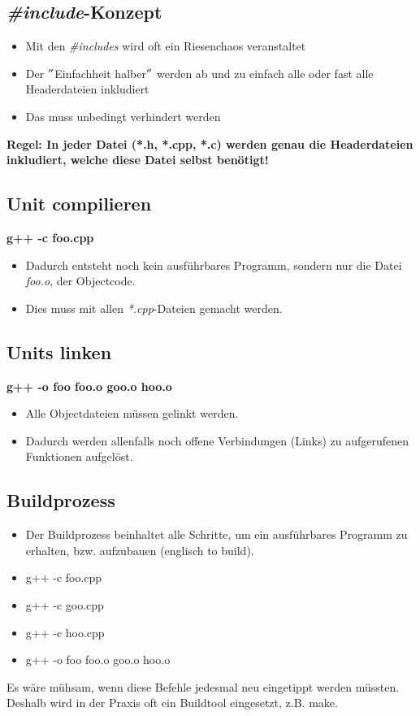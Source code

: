 \subsection{\emph{\#include}-Konzept}
\begin{itemize}
	\item Mit den \emph{\#includes} wird oft ein Riesenchaos veranstaltet
	\item Der $"$Einfachheit halber$"$ werden ab und zu einfach alle oder fast alle Headerdateien inkludiert
	\item Das muss unbedingt verhindert werden
\end{itemize}
\textbf{Regel: In jeder Datei (*.h, *.cpp, *.c) werden genau die Headerdateien inkludiert, welche diese Datei selbst benötigt!}

\begin{multicols}{2}
\subsection{Unit compilieren}
\begin{center}
	\textbf{g++ -c foo.cpp}
\end{center}
\begin{itemize}
	\item Dadurch entsteht noch kein ausführbares Programm, sondern nur die Datei \emph{foo.o}, der Objectcode.
	\item Dies muss mit allen \emph{*.cpp}-Dateien gemacht werden.
\end{itemize}
\columnbreak
\subsection{Units linken}
\begin{center}
	\textbf{g++ -o foo foo.o goo.o hoo.o}
\end{center}
\begin{itemize}
	\item Alle Objectdateien müssen gelinkt werden.
	\item Dadurch werden allenfalls noch offene Verbindungen (Links) zu aufgerufenen Funktionen aufgelöst.
\end{itemize}
\end{multicols}

\subsection{Buildprozess}
\begin{itemize}
	\item Der Buildprozess beinhaltet alle Schritte, um ein ausführbares Programm zu erhalten, bzw. aufzubauen (englisch to build).
	\item[\-] g++ -c foo.cpp
	\item[\-] g++ -c goo.cpp
	\item[\-] g++ -c hoo.cpp	
	\item[\-] g++ -o foo foo.o goo.o hoo.o
\end{itemize}
\begin{hinweis}
	Es wäre mühsam, wenn diese Befehle jedesmal neu eingetippt werden müssten. Deshalb wird in der Praxis oft ein Buildtool eingesetzt, z.B. make.
\end{hinweis}

